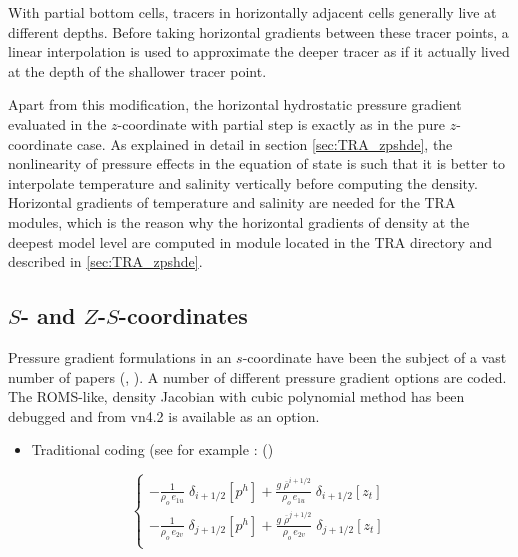 \documentclass[../main/NEMO_manual]{subfiles}
\begin{document}
With partial bottom cells, tracers in horizontally adjacent cells generally live at different depths.
Before taking horizontal gradients between these tracer points,
a linear interpolation is used to approximate the deeper tracer as if
it actually lived at the depth of the shallower tracer point.

Apart from this modification,
the horizontal hydrostatic pressure gradient evaluated in the $z$-coordinate with partial step is exactly as in
the pure $z$-coordinate case.
As explained in detail in section \autoref{sec:TRA_zpshde},
the nonlinearity of pressure effects in the equation of state is such that
it is better to interpolate temperature and salinity vertically before computing the density.
Horizontal gradients of temperature and salinity are needed for the TRA modules,
which is the reason why the horizontal gradients of density at the deepest model level are computed in
module  located in the TRA directory and described in \autoref{sec:TRA_zpshde}.

\subsection{$S$- and $Z$-$S$-coordinates}
\label{subsec:DYN_hpg_sco}

Pressure gradient formulations in an $s$-coordinate have been the subject of a vast number of papers
(\eg, \citet{song_MWR98, shchepetkin.mcwilliams_OM05}).
A number of different pressure gradient options are coded. The ROMS-like,
density Jacobian with cubic polynomial method has been debugged and from vn4.2 is available as an option.

\begin{itemize}
\item
Traditional coding (see for example \citet{madec.delecluse.ea_JPO96}: ()
\end{itemize}

\begin{equation}
  \label{eq:DYN_hpg_sco}
  \left\{
    \begin{aligned}
      - \frac{1}    					{\rho_o \, e_{1u}} \;	\delta_{i+1/2} \left[  p^h  \right]
      + \frac{g\; \overline {\rho}^{i+1/2}}	{\rho_o \, e_{1u}} \;	\delta_{i+1/2} \left[  z_t   \right]    \\
      - \frac{1}    					{\rho_o \, e_{2v}} \;	\delta_{j+1/2} \left[  p^h  \right]
      + \frac{g\; \overline {\rho}^{j+1/2}}	{\rho_o \, e_{2v}} \;	\delta_{j+1/2} \left[  z_t   \right]    \\
    \end{aligned}
  \right.
\end{equation}
\end{document}
